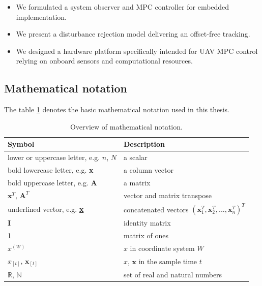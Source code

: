 \begin{itemize}
\item We formulated a system observer and MPC controller for embedded implementation.
\item We present a disturbance rejection model delivering an offset-free tracking.
\item We designed a hardware platform specifically intended for UAV MPC control relying on onboard sensors and computational resources.
\end{itemize}

\subsection{Mathematical notation}

The table \ref{tab:notation} denotes the basic mathematical notation used in this thesis.

\begin{table}[h]
\centering
\begin{tabular}{ll}
\hline
Symbol & Description \\
\hline
lower or uppercase letter, e.g. $n$, $N$ & a scalar \\
bold lowercase letter, e.g. \textbf{x} & a column vector \\ 
bold uppercase letter, e.g. \textbf{A} & a matrix \\
$\textbf{x}^T$, $\textbf{A}^T$ & vector and matrix transpose \\
underlined vector, e.g. \textbf{\underline{x}} & concatenated vectors $\left(\textbf{x}_1^T,\textbf{x}_2^T,...,\textbf{x}_n^T\right)^T$ \\
\textbf{I} & identity matrix \\
\textbf{1} & matrix of ones \\
$x^{(W)}$ & $x$ in coordinate system $W$ \\ 
$x_{[t]}$, $\textbf{x}_{[t]}$ & $x$, $\textbf{x}$ in the sample time $t$ \\
$\mathbb{R}$, $\mathbb{N}$ & set of real and natural numbers \\
\hline
\end{tabular}
\caption{Overview of mathematical notation.}
\label{tab:notation}
\end{table}

